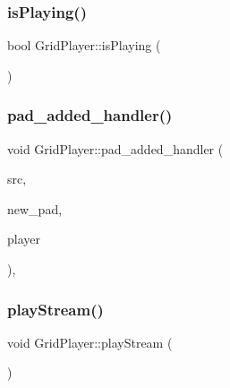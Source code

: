 \mbox{\label{class_grid_player_a90e8bed2e7bd8c83dfc9aa5c7d9c7135}} 
\subsubsection{\texorpdfstring{is\+Playing()}{isPlaying()}}
{\footnotesize\ttfamily bool Grid\+Player\+::is\+Playing (\begin{DoxyParamCaption}{ }\end{DoxyParamCaption})\hspace{0.3cm}{\ttfamily [inline]}}

\mbox{\label{class_grid_player_a5ba48d7c46b448125e2a6ad0ff6f92a3}} 
\subsubsection{\texorpdfstring{pad\+\_\+added\+\_\+handler()}{pad\_added\_handler()}}
{\footnotesize\ttfamily void Grid\+Player\+::pad\+\_\+added\+\_\+handler (\begin{DoxyParamCaption}\item[{Gst\+Element $\ast$}]{src,  }\item[{Gst\+Pad $\ast$}]{new\+\_\+pad,  }\item[{\hyperlink{class_grid_player}{Grid\+Player} $\ast$}]{player }\end{DoxyParamCaption})\hspace{0.3cm}{\ttfamily [static]}, {\ttfamily [private]}}

\mbox{\label{class_grid_player_a8a0d4770b337b17621cd396ac2a06357}} 
\subsubsection{\texorpdfstring{play\+Stream()}{playStream()}}
{\footnotesize\ttfamily void Grid\+Player\+::play\+Stream (\begin{DoxyParamCaption}{ }\end{DoxyParamCaption})}


